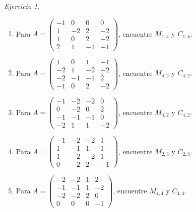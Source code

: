 \documentclass[12pt]{article}
\theoremstyle{remark}
\newtheorem{Ejer}[definicion]{Ejercicio}
\begin{document}
\begin{Ejer}
\begin{enumerate}[start=175]
\item Para $A=\begin{pmatrix}-1&0&0&0\\1&-2&2&-2\\1&0&2&-2\\2&1&-1&-1\end{pmatrix}$, encuentre $M_{1,4}$ y $C_{1,4}$.

\item Para $A=\begin{pmatrix}1&0&1&-1\\-2&1&-2&-2\\-2&-1&-1&2\\-1&0&2&-2\end{pmatrix}$, encuentre $M_{4,2}$ y $C_{4,2}$.

\item Para $A=\begin{pmatrix}-1&-2&-2&0\\0&-2&0&2\\-1&-1&-1&0\\-2&1&1&-2\end{pmatrix}$, encuentre $M_{4,2}$ y $C_{4,2}$.

\item Para $A=\begin{pmatrix}-1&-2&-2&1\\1&-1&1&1\\1&-2&-2&1\\0&-2&2&-1\end{pmatrix}$, encuentre $M_{2,3}$ y $C_{2,3}$.

\item Para $A=\begin{pmatrix}-2&-2&1&2\\-1&-1&1&-2\\-2&-2&2&0\\0&0&0&-1\end{pmatrix}$, encuentre $M_{4,4}$ y $C_{4,4}$.

\end{enumerate}
\end{Ejer}
\end{document}
